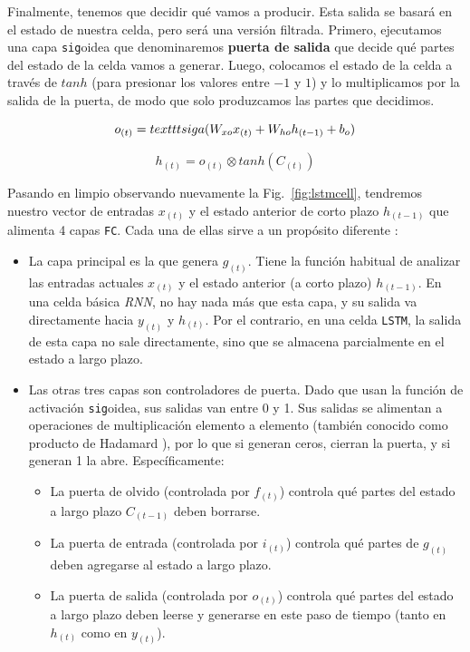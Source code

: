 \documentclass[a4paper,12pt]{article}
\begin{document}
Finalmente, tenemos que decidir qué vamos a producir. Esta salida se basará en el estado de nuestra celda, pero será una versión filtrada. Primero, ejecutamos una capa \texttt{sig}oidea que denominaremos \textbf{puerta de salida} que decide qué partes del estado de la celda vamos a generar. Luego, colocamos el estado de la celda a través de $tanh$ (para presionar los valores entre $-1$ y $1$) y lo multiplicamos por la salida de la puerta, de modo que solo produzcamos las partes que decidimos.

$$ o_{(t)}=\\texttt{sig}a (W_{xo}x_{(t)} + W_{ho}h_{(t-1)} + b_o) $$

$$ h_{(t)}=o_{(t)} \otimes tanh(C_{(t)})$$

Pasando en limpio observando nuevamente la Fig.~\ref{fig:lstmcell}, tendremos nuestro vector de entradas $x_{(t)}$ y el estado anterior de corto plazo $h_{(t-1)}$ que alimenta 4 capas \texttt{FC}. Cada una de ellas sirve a un propósito diferente \citep{geron}:

\begin{itemize}
	\item La capa principal es la que genera $g_{(t)}$. Tiene la función habitual de analizar las entradas actuales $x_{(t)}$ y el estado anterior (a corto plazo) $h_{(t-1)}$. En una celda básica \textit{RNN}, no hay nada más que esta capa, y su salida va directamente hacia $y_{(t)}$ y $h_{(t)}$. Por el contrario, en una celda \texttt{LSTM}, la salida de esta capa no sale directamente, sino que se almacena parcialmente en el estado a largo plazo.
	\item Las otras tres capas son controladores de puerta. Dado que usan la función de activación \texttt{sig}oidea, sus salidas van entre 0 y 1. Sus salidas se alimentan a operaciones de multiplicación elemento a elemento (también conocido como producto de Hadamard \citep{hadamard}), por lo que si generan ceros, cierran la puerta, y si generan 1 la abre. Específicamente:
	\begin{itemize}
	\item La puerta de olvido (controlada por $f_{(t)}$) controla qué partes del estado a largo plazo $C_{(t-1)}$ deben borrarse.
	\item La puerta de entrada (controlada por $i_{(t)}$) controla qué partes de $g_{(t)}$ deben agregarse al estado a largo plazo.
	\item La puerta de salida (controlada por $o_{(t)}$) controla qué partes del estado a largo plazo deben leerse y generarse en este paso de tiempo (tanto en $h_{(t)}$ como en $y_{(t)}$).
	\end{itemize}
\end{itemize}
\end{document}
